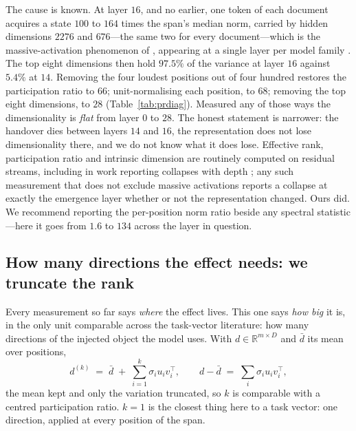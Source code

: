 \documentclass{article}
\newcommand{\dvec}{\ensuremath{d}}
\begin{document}
The cause is known. At layer $16$, and no earlier, one token of each document
acquires a state $100$ to $164$ times the span's median norm, carried by hidden
dimensions $2276$ and $676$---the same two for every document---which is the
massive-activation phenomenon of \citet{sun2024massive}, appearing at a single
layer per model family \citep{shi2026melayer}. The top eight dimensions then
hold $97.5\%$ of the variance at layer $16$ against $5.4\%$ at $14$. Removing
the four loudest positions out of four hundred restores the participation ratio
to $66$; unit-normalising each position, to $68$; removing the top eight
dimensions, to $28$ (Table~\ref{tab:prdiag}). Measured any of those ways the
dimensionality is \emph{flat} from layer $0$ to $28$. The honest statement is
narrower: the handover dies between layers $14$ and $16$, the representation
does not lose dimensionality there, and we do not know what it does lose.
Effective rank, participation ratio and intrinsic dimension are routinely
computed on residual streams, including in work reporting collapses with depth
\citep{fernando2026residualspectral, sarkar2026causaldim}; any such measurement
that does not exclude massive activations reports a collapse at exactly the
emergence layer whether or not the representation changed. Ours did. We
recommend reporting the per-position norm ratio beside any spectral
statistic---here it goes from $1.6$ to $134$ across the layer in question.

\subsection{How many directions the effect needs: we truncate the rank}
\label{sec:rank}

Every measurement so far says \emph{where} the effect lives. This one says
\emph{how big} it is, in the only unit comparable across the task-vector
literature: how many directions of the injected object the model uses. With
$\dvec \in \mathbb{R}^{m \times D}$ and $\bar{\dvec}$ its mean over positions,
\begin{equation}
\dvec^{(k)} \;=\; \bar{\dvec} \;+\; \sum_{i=1}^{k} \sigma_i u_i v_i^{\top},
\qquad
\dvec - \bar{\dvec} \;=\; \textstyle\sum_i \sigma_i u_i v_i^{\top},
\label{eq:rank}
\end{equation}
the mean kept and only the variation truncated, so $k$ is comparable with a
centred participation ratio. $k=1$ is the closest thing here to a task vector:
one direction, applied at every position of the span.
\end{document}
